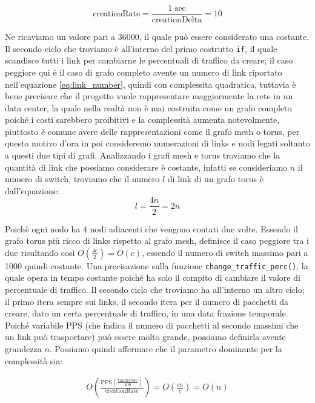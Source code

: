\documentclass[binding=0.6cm]{sapthesis}
\begin{document}
\begin{equation}
    \text{creationRate} = \frac{1 \text{ sec}}{\text{creationDelta}} = 10 
    \label{eq:creation_rate_example}
\end{equation}

Ne ricaviamo un valore pari a 36000, il quale può essere considerato una costante. Il secondo ciclo che troviamo è all'interno del primo costrutto \lstinline|if|, il quale scandisce tutti i link per cambiarne le percentuali di traffico da creare; il caso peggiore qui è il caso di grafo completo avente un numero di link
riportato nell'equazione \ref{eq:link_number}, quindi con complessita quadratica, tuttavia è bene precisare che il progetto vuole rappresentare maggiormente la rete in un data center, la quale nella realtà non è mai costruita come un grafo completo poiché i costi sarebbero proibitivi e la complessità aumenta notevolmente, piuttosto è comune avere delle 
rappresentazioni come il grafo mesh o torus, per questo motivo d'ora in poi consideremo numerazioni di links e nodi legati soltanto a questi due tipi di grafi. Analizzando i grafi mesh e torus troviamo che la quantità di link che possiamo considerare è costante, infatti
se consideriamo \(n\) il numero di switch, troviamo che il numero \(l\) di link di un grafo torus è dall'equazione:
\begin{equation}
    l = \frac{4n}{2} = 2n
    \label{eq:torus_link_number}
\end{equation}

Poichè ogni nodo ha 4 nodi adiacenti che vengono contati due volte. Essendo il grafo torus più ricco di links rispetto al grafo mesh, definisce il caso peggiore tra i due risultando così \(O(\frac{4c}{2}) = O(c)\), essendo il numero di switch massimo pari a 1000 quindi costante.
Una precisazione sulla funzione \lstinline|change_traffic_perc()|, la quale opera in tempo costante poiché ha solo il compito di cambiare il valore di percentuale di traffico.
Il secondo ciclo che troviamo ha all'interno un altro ciclo; il primo itera sempre sui links, il secondo itera per il numero di pacchetti da creare, dato un certa percentuale di traffico, in una data frazione temporale.
Poiché variabile PPS (che indica il numero di pacchetti al secondo massimi che un link può trasportare) può essere molto grande, possiamo definirla avente grandezza \(n\).
Possiamo quindi affermare che il parametro dominante per la complessità sia:

\begin{align}
    O(\frac{\text{PPS}(\frac{\text{trafficPerc}}{100})}{\text{creationRate}}) = O(\frac{cn}{c}) = O(n)
    \label{eq:packets_per_fractional_time}
\end{align}
\end{document}
